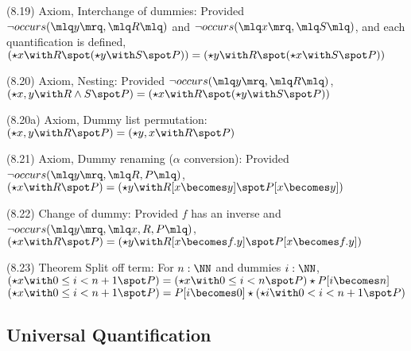 \documentclass[a4paper,10pt]{article}
\newenvironment{theoremlist}{
\begin{description}
  \setlength{\itemsep}{1.5pt}
  \setlength{\parskip}{0pt}
  \setlength{\parsep}{0pt}
}{\end{description}}
\begin{document}
\begin{theoremlist}
\item[(8.19) Axiom, Interchange of dummies:]					Provided $ \lnot occurs (\mlq y \mrq, \mlq R \mlq)$ and $ \lnot occurs (\mlq x \mrq, \mlq S \mlq)$, and each quantification is defined,\newline 
										$ (\star x \with R \spot (\star y \with S \spot P)) = (\star y \with R \spot (\star x \with S \spot P)) $

\item[(8.20) Axiom, Nesting:]							Provided $ \lnot occurs (\mlq y \mrq, \mlq R \mlq)$,\newline	
										$ (\star x,y \with R \land S \spot P) = (\star x \with R \spot (\star y \with S \spot P)) $

\item[(8.20a) Axiom, Dummy list permutation:]					$ (\star x,y \with R \spot P) = (\star y,x \with R \spot P) $

\item[(8.21) Axiom, Dummy renaming ($\alpha$ conversion):]			Provided $ \lnot occurs (\mlq y \mrq, \mlq R,P \mlq)$,\newline
										$ (\star x \with R \spot P) = (\star y \with R[x \becomes y] \spot P[x \becomes y]) $

\item[(8.22) Change of dummy:]							Provided $ f $ has an inverse and $ \lnot occurs (\mlq y \mrq, \mlq x,R,P \mlq)$,\newline
										$ (\star x \with R \spot P) = (\star y \with R[x \becomes f.y] \spot P[x \becomes f.y]) $

\item[(8.23) Theorem Split off term:]						For $n:\NN$ and dummies $i:\NN$,\newline			
										$ (\star x \with 0 \leq i < n + 1 \spot P) = (\star x \with 0 \leq i < n \spot P) \star P[i \becomes n] $
										\newline
										$ (\star x \with 0 \leq i < n + 1 \spot P) = P[i \becomes 0] \star (\star i \with 0 < i < n + 1 \spot P) $
\end{theoremlist}


\subsection{Universal Quantification}
\end{document}
